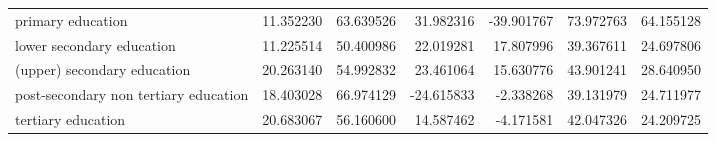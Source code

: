 \documentclass{article}
\begin{document}
\begin{table}[!htbp]
\begin{center}
{\begin{tabular}{lrrrrrr}
primary education                     &  11.352230 &  63.639526 &  31.982316 & -39.901767 &  73.972763 &  64.155128 \\
lower secondary education             &  11.225514 &  50.400986 &  22.019281 &  17.807996 &  39.367611 &  24.697806 \\
(upper) secondary education           &  20.263140 &  54.992832 &  23.461064 &  15.630776 &  43.901241 &  28.640950 \\
post-secondary non tertiary education &  18.403028 &  66.974129 & -24.615833 &  -2.338268 &  39.131979 &  24.711977 \\
tertiary education                    &  20.683067 &  56.160600 &  14.587462 &  -4.171581 &  42.047326 &  24.209725 \\
\bottomrule
\end{tabular}

}
\end{center}
\end{table}
\end{document}
